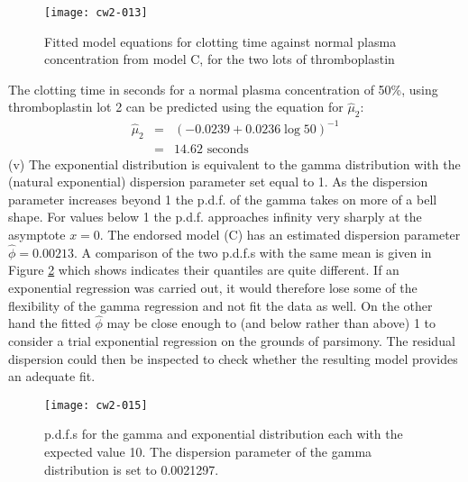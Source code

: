 \documentclass[a4paper,11pt]{article}
\begin{document}
\begin{figure}[h]
\begin{center}
\texttt{[image: cw2-013]}
\caption{Fitted model equations for clotting time against normal plasma concentration from model C, for the two lots of thromboplastin}
\label{fig:fitclot}
\end{center}
\end{figure}

The clotting time in seconds for a normal plasma concentration of 50\%, using thromboplastin lot 2 can be predicted using the equation for $\hat\mu_2$:
\begin{eqnarray*}
\hat\mu_2 & = & (-0.0239 + 0.0236\log 50)^{-1}\\
          & = &
14.62 \text{ seconds}
\end{eqnarray*}
(v) The exponential distribution is equivalent to the gamma distribution with the (natural exponential) dispersion parameter set equal to 1. As the dispersion parameter increases beyond 1 the p.d.f. of the gamma takes on more of a bell shape. For values below 1 the p.d.f. approaches infinity very sharply at the asymptote $x=0$. The endorsed model (C) has an estimated dispersion parameter $\hat\phi=0.00213$. A comparison of the two p.d.f.s with the same mean is given in Figure \ref{fig:gammaexp} which shows indicates their quantiles are quite different. If an exponential regression was carried out, it would therefore lose some of the flexibility of the gamma regression and not fit the data as well. On the other hand the fitted $\hat\phi$ may be close enough to (and below rather than above) 1 to consider a trial exponential regression on the grounds of parsimony. The residual dispersion could then be inspected to check whether the resulting model provides an adequate fit.
\begin{figure}
\begin{center}
\texttt{[image: cw2-015]}
\caption{p.d.f.s for the gamma and exponential distribution each with the expected value 10. The dispersion parameter of the gamma distribution is set to 0.0021297.}
\label{fig:gammaexp}
\end{center}
\end{figure}
\end{document}
